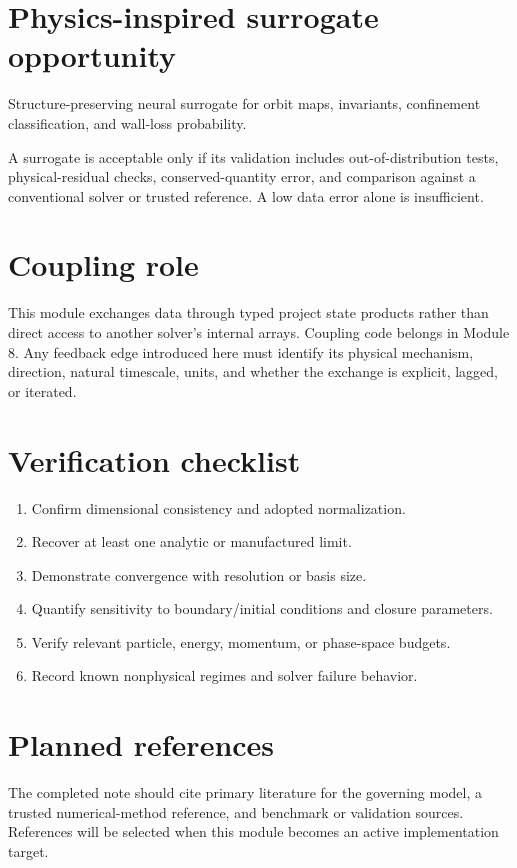 \documentclass[11pt]{article}
\begin{document}
\section{Physics-inspired surrogate opportunity}
Structure-preserving neural surrogate for orbit maps, invariants, confinement classification, and wall-loss probability.

A surrogate is acceptable only if its validation includes out-of-distribution tests, physical-residual checks, conserved-quantity error, and comparison against a conventional solver or trusted reference. A low data error alone is insufficient.

\section{Coupling role}
This module exchanges data through typed project state products rather than direct access to another solver's internal arrays. Coupling code belongs in Module 8. Any feedback edge introduced here must identify its physical mechanism, direction, natural timescale, units, and whether the exchange is explicit, lagged, or iterated.

\section{Verification checklist}
\begin{enumerate}[leftmargin=1.6em]
\item Confirm dimensional consistency and adopted normalization.
\item Recover at least one analytic or manufactured limit.
\item Demonstrate convergence with resolution or basis size.
\item Quantify sensitivity to boundary/initial conditions and closure parameters.
\item Verify relevant particle, energy, momentum, or phase-space budgets.
\item Record known nonphysical regimes and solver failure behavior.
\end{enumerate}

\section{Planned references}
The completed note should cite primary literature for the governing model, a trusted numerical-method reference, and benchmark or validation sources. References will be selected when this module becomes an active implementation target.
\end{document}
